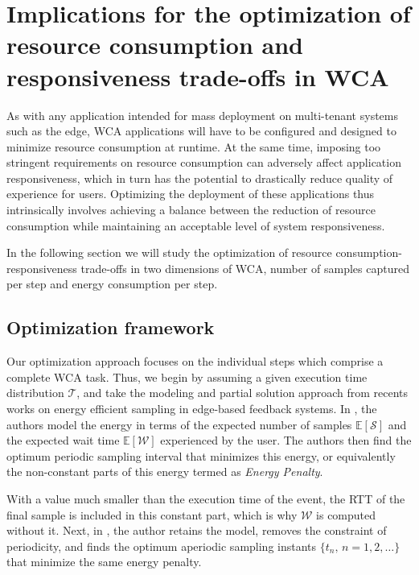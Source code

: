 \section{Implications for the optimization of resource consumption and responsiveness trade-offs in \ac{WCA}}\label{sec:implications:optimization}

As with any application intended for mass deployment on multi-tenant systems such as the edge, \ac{WCA} applications will have to be configured and designed to minimize resource consumption at runtime.
At the same time, imposing too stringent requirements on resource consumption can adversely affect application responsiveness, which in turn has the potential to drastically reduce quality of experience for users.
Optimizing the deployment of these applications thus intrinsically involves achieving a balance between the reduction of resource consumption while maintaining an acceptable level of system responsiveness.

In the following section we will study the optimization of resource consumption-responsiveness trade-offs in two dimensions of \ac{WCA}, number of samples captured per step and energy consumption per step.


\subsection{Optimization framework}\label{ssec:optframework}

Our optimization approach focuses on the individual steps which comprise a complete \ac{WCA} task.
Thus, we begin by assuming a given execution time distribution \( \mathcal{T} \), and take the modeling and partial solution approach from recents works on energy efficient sampling in edge-based feedback systems.
In \textcite{Moothedath2021EnergyOptimal,Moothedath2022EnergyEfficient}, the authors model the energy in terms of the expected number of samples $\mathbb{E}[\mathcal{S}]$ and the expected wait time $\mathbb{E}[\mathcal{W}]$ experienced by the user.
The authors then find the optimum periodic sampling interval that minimizes this energy, or equivalently the non-constant parts of this energy termed as \textit{Energy Penalty}.

With a value much smaller than the execution time of the event, the \ac{RTT} of the final sample is included in this constant part, which is why $\mathcal{W}$ is computed without it.
Next, in \textcite{Moothedath2022Aperiodic}, the author retains the model, removes the constraint of periodicity, and finds the optimum aperiodic sampling instants $\{t_n,\,n=1,2,\dots\}$ that minimize the same energy penalty.


